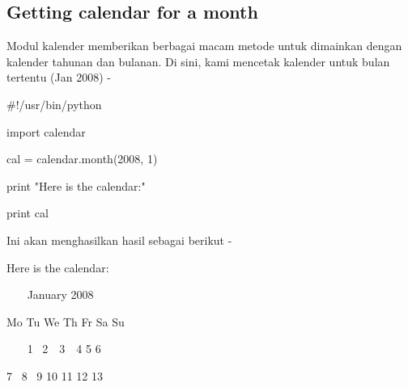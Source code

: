 \documentclass[a4paper,12pt]{report}
\begin{document}
\subsection*{Getting calendar for a month}
 \par
\begin{adjustwidth}{0.03in}{0.03in}
Modul kalender memberikan berbagai macam metode untuk dimainkan dengan kalender tahunan dan bulanan. Di sini, kami mencetak kalender untuk bulan tertentu (Jan 2008) -\end{adjustwidth}
 \par
\noindent 
 \hspace*{0.5in}  $  \#  $!/usr/bin/python \par
\noindent 
 \hspace*{0.5in} import calendar \par
\vspace{12pt}
\noindent 
 \hspace*{0.5in} cal = calendar.month(2008, 1) \par
\noindent 
 \hspace*{0.5in} print "Here is the calendar:" \par
\noindent 
 \hspace*{0.5in} print cal \par
\vspace{12pt}
\begin{adjustwidth}{0.03in}{0.03in}
Ini akan menghasilkan hasil sebagai berikut -\end{adjustwidth}
 \par
\noindent 
{\fontsize{9pt}{9pt}\selectfont  \hspace*{0.5in} Here is the calendar:} \par
\noindent 
{\fontsize{9pt}{9pt}\selectfont ~~~  \hspace*{0.5in}  \hspace*{0.5in} January 2008} \par
\noindent 
{\fontsize{9pt}{9pt}\selectfont  \hspace*{0.5in} Mo Tu We Th Fr Sa Su} \par
\noindent 
{\fontsize{9pt}{9pt}\selectfont ~~~  \hspace*{0.5in}  \hspace*{0.5in} 1~ 2~~3~~4  5  6} \par
\noindent 
{\fontsize{9pt}{9pt}\selectfont   \hspace*{0.5in}  \hspace*{0.5in} 7~ 8~ 9 10 11 12 13} \par
\end{document}
